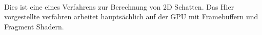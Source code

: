 \kurzfassung

\paragraph*{}
Dies ist eine eines Verfahrens zur Berechnung von 2D Schatten. 
Das Hier vorgestellte verfahren arbeitet hauptsächlich auf der GPU
mit Framebuffern und Fragment Shadern.
